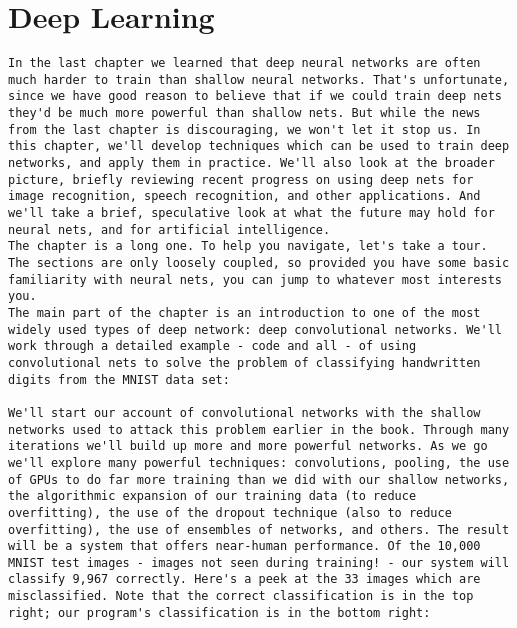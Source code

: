 
\chapter{Deep Learning}
\label{sec:DeepLearning}





\begin{lstlisting}
In the last chapter we learned that deep neural networks are often much harder to train than shallow neural networks. That's unfortunate, since we have good reason to believe that if we could train deep nets they'd be much more powerful than shallow nets. But while the news from the last chapter is discouraging, we won't let it stop us. In this chapter, we'll develop techniques which can be used to train deep networks, and apply them in practice. We'll also look at the broader picture, briefly reviewing recent progress on using deep nets for image recognition, speech recognition, and other applications. And we'll take a brief, speculative look at what the future may hold for neural nets, and for artificial intelligence.
The chapter is a long one. To help you navigate, let's take a tour. The sections are only loosely coupled, so provided you have some basic familiarity with neural nets, you can jump to whatever most interests you.
The main part of the chapter is an introduction to one of the most widely used types of deep network: deep convolutional networks. We'll work through a detailed example - code and all - of using convolutional nets to solve the problem of classifying handwritten digits from the MNIST data set:

We'll start our account of convolutional networks with the shallow networks used to attack this problem earlier in the book. Through many iterations we'll build up more and more powerful networks. As we go we'll explore many powerful techniques: convolutions, pooling, the use of GPUs to do far more training than we did with our shallow networks, the algorithmic expansion of our training data (to reduce overfitting), the use of the dropout technique (also to reduce overfitting), the use of ensembles of networks, and others. The result will be a system that offers near-human performance. Of the 10,000 MNIST test images - images not seen during training! - our system will classify 9,967 correctly. Here's a peek at the 33 images which are misclassified. Note that the correct classification is in the top right; our program's classification is in the bottom right:


\end{lstlisting}
